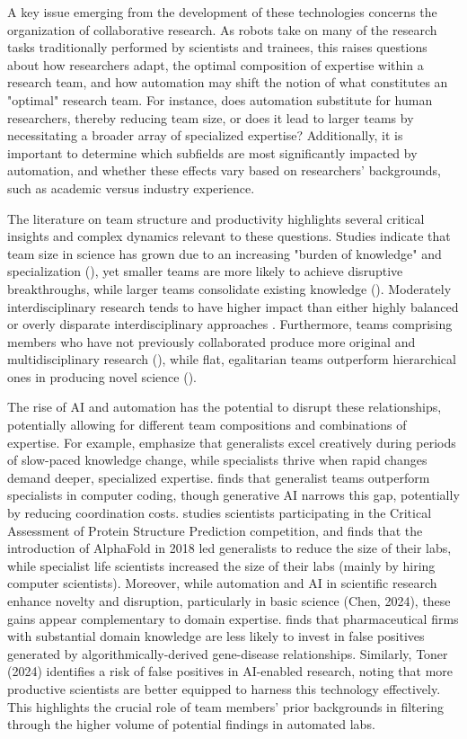 \documentclass{article}
\begin{document}
A key issue emerging from the development of these technologies concerns the organization of collaborative research. As robots take on many of the research tasks traditionally performed by scientists and trainees, this raises questions about how researchers adapt, the optimal composition of expertise within a research team, and how automation may shift the notion of what constitutes an "optimal" research team. For instance, does automation substitute for human researchers, thereby reducing team size, or does it lead to larger teams by necessitating a broader array of specialized expertise? Additionally, it is important to determine which subfields are most significantly impacted by automation, and whether these effects vary based on researchers' backgrounds, such as academic versus industry experience.


The literature on team structure and productivity highlights several critical insights and complex dynamics relevant to these questions. Studies indicate that team size in science has grown due to an increasing "burden of knowledge" and specialization (\cite{jones2009burden}), yet smaller teams are more likely to achieve disruptive breakthroughs, while larger teams consolidate existing knowledge (\cite{wu2019large}). Moderately interdisciplinary research tends to have higher impact than either highly balanced or overly disparate interdisciplinary approaches \cite{yegros2015does}. Furthermore, teams comprising members who have not previously collaborated produce more original and multidisciplinary research (\cite{zeng2021fresh}), while flat, egalitarian teams outperform hierarchical ones in producing novel science (\cite{xu2022flat}).

The rise of AI and automation has the potential to disrupt these relationships, potentially allowing for different team compositions and combinations of expertise. For example, \cite{teodoridis2019creativity} emphasize that generalists excel creatively during periods of slow-paced knowledge change, while specialists thrive when rapid changes demand deeper, specialized expertise. \cite{Greska} finds that generalist teams outperform specialists in computer coding, though generative AI narrows this gap, potentially by reducing coordination costs. \cite{cavalli} studies scientists participating in the Critical Assessment of Protein Structure Prediction competition, and finds that the introduction of AlphaFold in 2018 led generalists to reduce the size of their labs, while specialist life scientists increased the size of their labs (mainly by hiring computer scientists).  Moreover, while automation and AI in scientific research enhance novelty and disruption, particularly in basic science (Chen, 2024), these gains appear complementary to domain expertise. \cite{tranchero2024finding} finds that pharmaceutical firms with substantial domain knowledge are less likely to invest in false positives generated by algorithmically-derived gene-disease relationships. Similarly, Toner (2024) identifies a risk of false positives in AI-enabled research, noting that more productive scientists are better equipped to harness this technology effectively. This highlights the crucial role of team members' prior backgrounds in filtering through the higher volume of potential findings in automated labs. 
\end{document}
